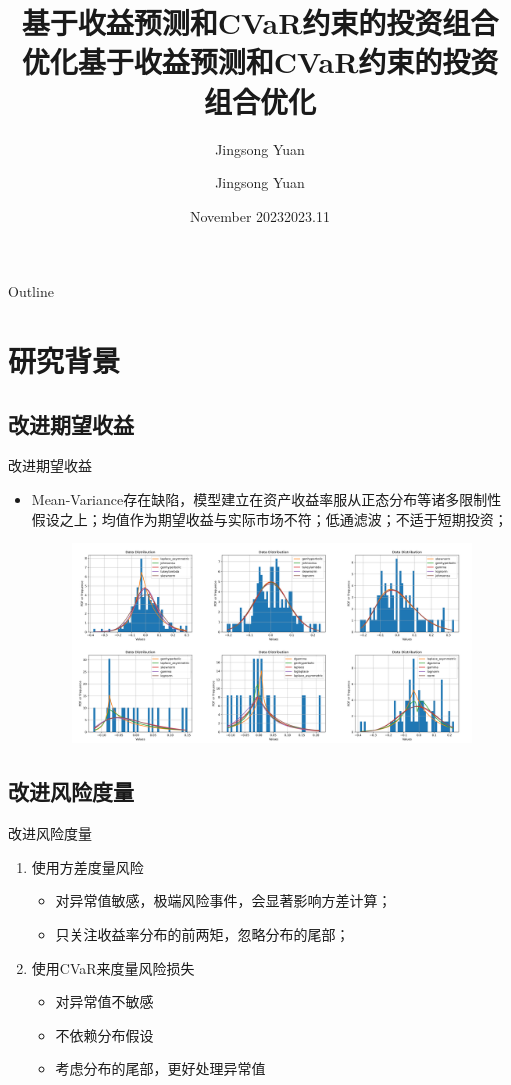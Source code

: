 \documentclass[CJK,aspectratio=169]{beamer}  %
\title{基于收益预测和CVaR约束的投资组合优化}
\author{Jingsong Yuan}
\date{November 2023}
\begin{document}
	\begin{frame}
		\title{基于收益预测和CVaR约束的投资组合优化}
		\author{Jingsong Yuan} %
		\date{2023.11}  %
		\titlepage
	\end{frame}
	\begin{frame}{Outline}
	\end{frame}
\section{研究背景}
\subsection{改进期望收益}
	\begin{frame}{改进期望收益}
			\begin{itemize}
				\item Mean-Variance存在缺陷，模型建立在资产收益率服从正态分布等诸多限制性假设之上；均值作为期望收益与实际市场不符；低通滤波；不适于短期投资；
			\begin{figure}
				\centering
				\includegraphics[width=0.9\linewidth]{"pic/distribution of random six"}
				\caption{}
				\label{fig:distribution-of-random-stock}
			\end{figure}
			\end{itemize}
	\end{frame}
\subsection{改进风险度量}
	\begin{frame}{改进风险度量}
		\begin{enumerate}
			\item 使用方差度量风险
			\begin{itemize}
				\item 对异常值敏感，极端风险事件，会显著影响方差计算；
				\item 只关注收益率分布的前两矩，忽略分布的尾部；
			\end{itemize}
			\item 使用CVaR来度量风险损失
			\begin{itemize}
				\item 对异常值不敏感
				\item 不依赖分布假设
				\item 考虑分布的尾部，更好处理异常值
			\end{itemize}
		\end{enumerate}
	\end{frame}
\end{document}
